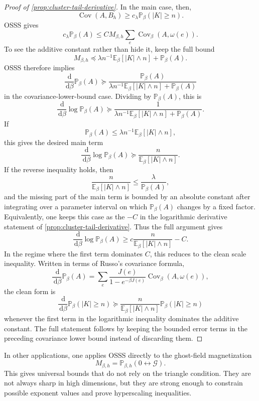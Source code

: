 \documentclass[11pt,reqno]{book}
\numberwithin{equation}{chapter}
\theoremstyle{plain}
\theoremstyle{definition}
\theoremstyle{remark}
\renewcommand{\P}{\mathbb P}
\newcommand{\E}{\mathbb E}
\newcommand{\1}{\mathbf 1}
\newcommand{\dd}{\,\mathrm d}
\newcommand{\suc}{\succeq}
\begin{document}
\begin{proof}[Proof of \cref{prop:cluster-tail-derivative}]
In the main case, then,
\[
  \operatorname{Cov}(A,B_h)\geq c_\lambda\P_\beta(|K|\geq n).
\]
OSSS gives
\[
  c_\lambda\P_\beta(A)
  \leq
  C M_{\beta,h}\sum_e\operatorname{Cov}_\beta(A,\omega(e)).
\]
To see the additive constant rather than hide it, keep the full bound
\[
  M_{\beta,h}\preceq
  \lambda n^{-1}\E_\beta[|K|\wedge n]+\P_\beta(A).
\]
OSSS therefore implies
\[
  \frac{\dd}{\dd\beta}\P_\beta(A)
  \suc
  \frac{\P_\beta(A)}
       {\lambda n^{-1}\E_\beta[|K|\wedge n]+\P_\beta(A)}
\]
in the covariance-lower-bound case. Dividing by \(\P_\beta(A)\), this is
\[
  \frac{\dd}{\dd\beta}\log\P_\beta(A)
  \suc
  \frac{1}
       {\lambda n^{-1}\E_\beta[|K|\wedge n]+\P_\beta(A)}.
\]
If
\[
  \P_\beta(A)\leq
  \lambda n^{-1}\E_\beta[|K|\wedge n],
\]
this gives the desired main term
\[
  \frac{\dd}{\dd\beta}\log\P_\beta(A)
  \suc
  \frac{n}{\E_\beta[|K|\wedge n]}.
\]
If the reverse inequality holds, then
\[
  \frac{n}{\E_\beta[|K|\wedge n]}
  \leq
  \frac{\lambda}{\P_\beta(A)},
\]
and the missing part of the main term is bounded by an absolute constant
after integrating over a parameter interval on which \(\P_\beta(A)\) changes
by a fixed factor. Equivalently, one keeps this case as the \(-C\) in the
logarithmic derivative statement of \cref{prop:cluster-tail-derivative}.
Thus the full argument gives
\[
  \frac{\dd}{\dd\beta}\log\P_\beta(A)
  \geq
  c\frac{n}{\E_\beta[|K|\wedge n]}-C.
\]
In the regime where the first term dominates \(C\), this reduces to the clean
scale inequality. Written in terms of Russo's covariance formula,
\[
  \frac{\dd}{\dd\beta}\P_\beta(A)
  =
  \sum_e
  \frac{J(e)}{1-e^{-\beta J(e)}}\operatorname{Cov}_\beta(A,\omega(e)),
\]
the clean form is
\[
  \frac{\dd}{\dd\beta}\P_\beta(|K|\geq n)
  \suc
  \frac{n}{\E_\beta[|K|\wedge n]}
  \P_\beta(|K|\geq n)
\]
whenever the first term in the logarithmic inequality dominates the additive
constant. The full statement follows by keeping the bounded error terms in
the preceding covariance lower bound instead of discarding them.
\end{proof}

In other applications, one applies OSSS directly to the ghost-field magnetization
\[
  M_{\beta,h}=\mathbb P_{\beta,h}(0\leftrightarrow \mathcal G).
\]
This gives universal bounds that do not rely on the triangle condition. They are not always sharp in high dimensions, but they are strong enough to constrain possible exponent values and prove hyperscaling inequalities.
\end{document}
